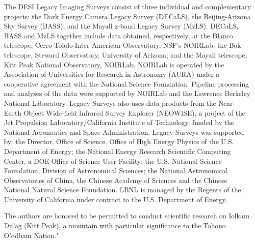 The DESI Legacy Imaging Surveys consist of three individual and complementary projects: the Dark Energy Camera Legacy Survey (DECaLS), the Beijing-Arizona Sky Survey (BASS), and the Mayall z-band Legacy Survey (MzLS). DECaLS, BASS and MzLS together include data obtained, respectively, at the Blanco telescope, Cerro Tololo Inter-American Observatory, NSF’s NOIRLab; the Bok telescope, Steward Observatory, University of Arizona; and the Mayall telescope, Kitt Peak National Observatory, NOIRLab. NOIRLab is operated by the Association of Universities for Research in Astronomy (AURA) under a cooperative agreement with the National Science Foundation. Pipeline processing and analyses of the data were supported by NOIRLab and the Lawrence Berkeley National Laboratory. Legacy Surveys also uses data products from the Near-Earth Object Wide-field Infrared Survey Explorer (NEOWISE), a project of the Jet Propulsion Laboratory/California Institute of Technology, funded by the National Aeronautics and Space Administration. Legacy Surveys was supported by: the Director, Office of Science, Office of High Energy Physics of the U.S. Department of Energy; the National Energy Research Scientific Computing Center, a DOE Office of Science User Facility; the U.S. National Science Foundation, Division of Astronomical Sciences; the National Astronomical Observatories of China, the Chinese Academy of Sciences and the Chinese National Natural Science Foundation. LBNL is managed by the Regents of the University of California under contract to the U.S. Department of Energy. 

The authors are honored to be permitted to conduct scientific research on Iolkam Du’ag (Kitt Peak), a mountain with particular significance to the Tohono O’odham Nation."